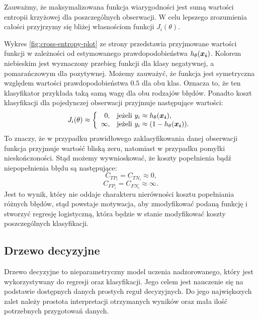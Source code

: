 \documentclass[inzynierska]{pwr_wmat_praca_dyplomowa}
\theoremstyle{plain}
\numberwithin{theorem}{chapter}
\theoremstyle{definition}
\numberwithin{theorem}{chapter}
\begin{document}
Zauważmy, że maksymalizowana funkcja wiarygodności jest sumą wartości entropii krzyżowej dla poszczególnych obserwacji. W celu lepszego zrozumienia całości przyjrzymy się bliżej własnościom funkcji $J_i(\theta)$.

Wykres \ref{fig:cross-entropy-plot} ze strony \pageref{fig:cross-entropy-plot} przedstawia przyjmowane wartości funkcji w zależności od estymowanego prawdopodobieństwa $h_{\theta}(\boldsymbol{x_i})$. Kolorem niebieskim jest wyznaczony przebieg funkcji dla klasy negatywnej, a pomarańczowym dla pozytywnej. Możemy zauważyć, że funkcja jest symetryczna względem wartości prawdopodobieństwa $0.5$ dla obu klas. Oznacza to, że ten klasyfikator przykłada taką samą wagę dla obu rodzajów błędów. Ponadto koszt klasyfikacji dla pojedynczej obserwacji przyjmuje następujące wartości:
$$
J_i(\theta) \approx \left\{
\begin{array}{rl}
0, &\mbox{jeżeli $y_i \approx h_{\theta}(\boldsymbol{x_i})$}, \\
\infty, &\mbox{jeżeli $y_i \approx (1 - h_{\theta}(\boldsymbol{x_i}))$}.
\end{array}{}
\right.
$$
To znaczy, że w przypadku prawidłowego zaklasyfikowania danej obserwacji funkcja przyjmuje wartość bliską zeru, natomiast w przypadku pomyłki nieskończoności. Stąd możemy wywnioskować, że koszty popełnienia bądź niepopełnienia błędu są następujące:
$$ C_{TP_i} = C_{TN_i} \approx 0 \text{,}$$
$$ C_{FP_i} = C_{FN_i} \approx \infty \text{.}$$
Jest to wynik, który nie oddaje charakteru nierówności kosztu popełniania różnych błędów, stąd powstaje motywacja, aby zmodyfikować podaną funkcję i stworzyć regresję logistyczną, która będzie w stanie modyfikować koszty poszczególnych klasyfikacji.

\subsection{Drzewo decyzyjne}
\label{drzewo}
Drzewo decyzyjne to nieparametryczny model uczenia nadzorowanego, który jest wykorzystywany do regresji oraz klasyfikacji. Jego celem jest nauczenie się na podstawie dostępnych danych prostych reguł decyzyjnych. Do jego największych zalet należy prostota interpretacji otrzymanych wyników oraz mała ilość potrzebnych przygotowań danych.
\end{document}
